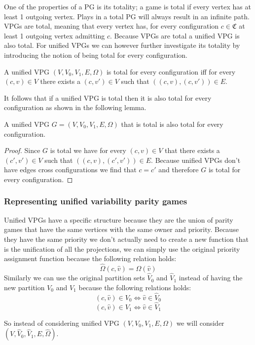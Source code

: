 One of the properties of a PG is its totality; a game is total if every vertex has at least 1 outgoing vertex. Plays in a total PG will always result in an infinite path. VPGs are total, meaning that every vertex has, for every configuration $c \in \mathfrak{C}$ at least 1 outgoing vertex admitting $c$. Because VPGs are total a unified VPG is also total. For unified VPGs we can however further investigate its totality by introducing the notion of being total for every configuration. 
\begin{definition}
	A unified VPG $(V,V_0,V_1,E,\Omega)$ is total for every configuration iff for every $(c,v) \in V$ there exists a $(c,v') \in V$ such that $((c,v),(c,v')) \in E$.
\end{definition}

It follows that if a unified VPG is total then it is also total for every configuration as shown in the following lemma.
\begin{lemma}
	\label{lem_UVPG_total}
	A unified VPG $G = (V,V_0,V_1,E,\Omega)$ that is total is also total for every configuration.
	\begin{proof}
		Since $G$ is total we have for every $(c,v) \in V$ that there exists a $(c',v') \in V$ such that $((c,v),(c',v')) \in E$. Because unified VPGs don't have edges cross configurations we find that $c = c'$ and therefore $G$ is total for every configuration.
	\end{proof}
\end{lemma}


\subsubsection{Representing unified variability parity games}
Unified VPGs have a specific structure because they are the union of parity games that have the same vertices with the same owner and priority. Because they have the same priority we don't actually need to create a new function that is the unification of all the projections, we can simply use the original priority assignment function because the following relation holds:
\[ \hat{\Omega}(c,\hat{v}) = \Omega(\hat{v}) \]
Similarly we can use the original partition sets $\hat{V}_0$ and $\hat{V}_1$ instead of having the new partition $V_0$ and $V_1$ because the following relations holds:
\[ (c,\hat{v}) \in V_0 \iff \hat{v}\in \hat{V}_0 \]
\[ (c,\hat{v}) \in V_1 \iff \hat{v}\in \hat{V}_1 \]

So instead of considering unified VPG $(V,V_0,V_1,E,\Omega)$ we will consider $(V,\hat{V}_0,\hat{V}_1,E,\hat{\Omega})$. 

